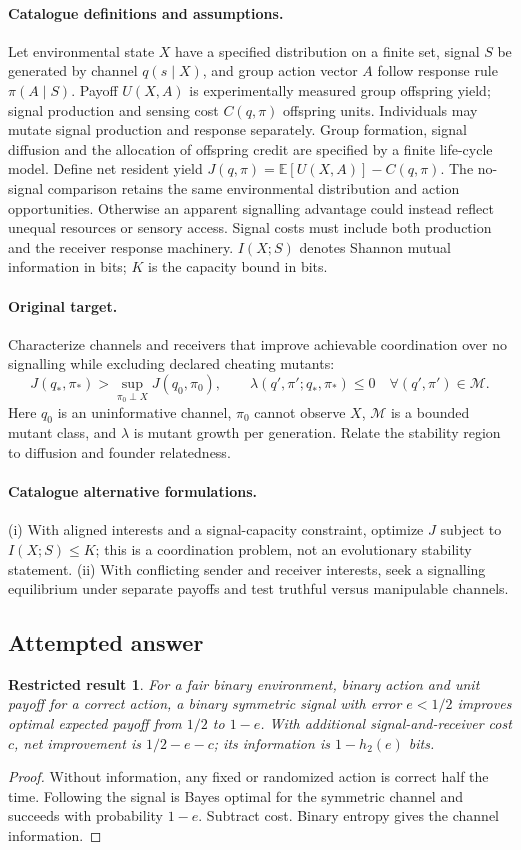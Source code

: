 \documentclass[11pt]{article}
\newcommand{\E}{\mathbb E}
\providecommand{\E}{\mathbb E}
\newtheorem{attemptresult}{Restricted result}[section]
\begin{document}
\paragraph{Catalogue definitions and assumptions.}
Let environmental state $X$ have a specified distribution on a finite set, signal $S$ be generated by channel $q(s\mid X)$, and group action vector $A$ follow response rule $\pi(A\mid S)$. Payoff $U(X,A)$ is experimentally measured group offspring yield; signal production and sensing cost $C(q,\pi)$ offspring units. Individuals may mutate signal production and response separately. Group formation, signal diffusion and the allocation of offspring credit are specified by a finite life-cycle model. Define net resident yield $J(q,\pi)=\E[U(X,A)]-C(q,\pi)$. The no-signal comparison retains the same environmental distribution and action opportunities. Otherwise an apparent signalling advantage could instead reflect unequal resources or sensory access. Signal costs must include both production and the receiver response machinery. $I(X;S)$ denotes Shannon mutual information in bits; $K$ is the capacity bound in bits.
\paragraph{Original target.}
Characterize channels and receivers that improve achievable coordination over no signalling while excluding declared cheating mutants:
\[
 J(q_*,\pi_*)>\sup_{\pi_0\perp X}J(q_0,\pi_0),
 \qquad \lambda(q',\pi';q_*,\pi_*)\le0
 \quad\forall(q',\pi')\in\mathcal M.
\]
Here $q_0$ is an uninformative channel, $\pi_0$ cannot observe $X$, $\mathcal M$ is a bounded mutant class, and $\lambda$ is mutant growth per generation. Relate the stability region to diffusion and founder relatedness.
\paragraph{Catalogue alternative formulations.}
(i) With aligned interests and a signal-capacity constraint, optimize $J$ subject to $I(X;S)\le K$; this is a coordination problem, not an evolutionary stability statement. (ii) With conflicting sender and receiver interests, seek a signalling equilibrium under separate payoffs and test truthful versus manipulable channels.
\subsection{Attempted answer}
\begin{attemptresult}
For a fair binary environment, binary action and unit payoff for a correct action, a binary symmetric signal with error $e<1/2$ improves optimal expected payoff from $1/2$ to $1-e$. With additional signal-and-receiver cost $c$, net improvement is $1/2-e-c$; its information is $1-h_2(e)$ bits.
\end{attemptresult}
\begin{proof}
Without information, any fixed or randomized action is correct half the time. Following the signal is Bayes optimal for the symmetric channel and succeeds with probability $1-e$. Subtract cost. Binary entropy gives the channel information.
\end{proof}
\end{document}
